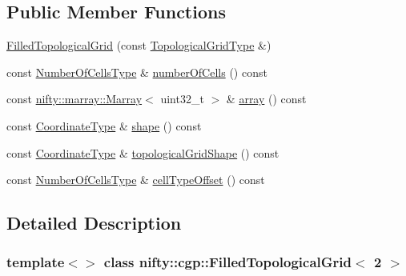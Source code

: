 \subsection*{Public Member Functions}
\begin{DoxyCompactItemize}
\item 
\hyperlink{classnifty_1_1cgp_1_1FilledTopologicalGrid_3_012_01_4_abdd8feabb36e019fb27d2a57c025ae06}{Filled\+Topological\+Grid} (const \hyperlink{classnifty_1_1cgp_1_1FilledTopologicalGrid_3_012_01_4_a18ed401fbaca132c3a3bce16c8f448a9}{Topological\+Grid\+Type} \&)
\item 
const \hyperlink{classnifty_1_1cgp_1_1FilledTopologicalGrid_3_012_01_4_a4026316cb9c7a8e6958cb32e6324ea7d}{Number\+Of\+Cells\+Type} \& \hyperlink{classnifty_1_1cgp_1_1FilledTopologicalGrid_3_012_01_4_a1710a836224873e51799fc0e87753d27}{number\+Of\+Cells} () const
\item 
const \hyperlink{classandres_1_1Marray}{nifty\+::marray\+::\+Marray}$<$ uint32\+\_\+t $>$ \& \hyperlink{classnifty_1_1cgp_1_1FilledTopologicalGrid_3_012_01_4_a94cbda5048125dbece8c611b3adad5b2}{array} () const
\item 
const \hyperlink{classnifty_1_1cgp_1_1FilledTopologicalGrid_3_012_01_4_a744d1529d7bb50ca95236a5abaded0ad}{Coordinate\+Type} \& \hyperlink{classnifty_1_1cgp_1_1FilledTopologicalGrid_3_012_01_4_a67dd5005e193062994b82b67ea616cbc}{shape} () const
\item 
const \hyperlink{classnifty_1_1cgp_1_1FilledTopologicalGrid_3_012_01_4_a744d1529d7bb50ca95236a5abaded0ad}{Coordinate\+Type} \& \hyperlink{classnifty_1_1cgp_1_1FilledTopologicalGrid_3_012_01_4_a080aefa39bb9aa31ad881eab0683673b}{topological\+Grid\+Shape} () const
\item 
const \hyperlink{classnifty_1_1cgp_1_1FilledTopologicalGrid_3_012_01_4_a4026316cb9c7a8e6958cb32e6324ea7d}{Number\+Of\+Cells\+Type} \& \hyperlink{classnifty_1_1cgp_1_1FilledTopologicalGrid_3_012_01_4_af7902f54d76c04a378bc51afc051accb}{cell\+Type\+Offset} () const
\end{DoxyCompactItemize}


\subsection{Detailed Description}
\subsubsection*{template$<$$>$\newline
class nifty\+::cgp\+::\+Filled\+Topological\+Grid$<$ 2 $>$}

